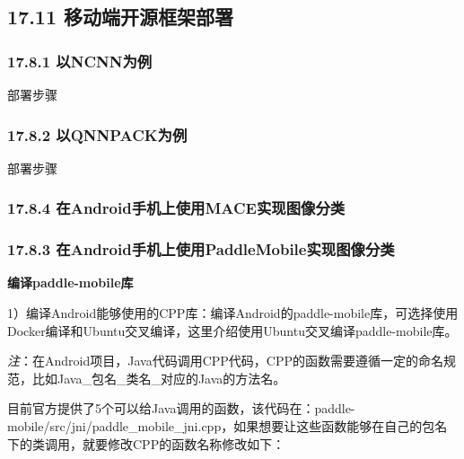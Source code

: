 \subsection{17.11
移动端开源框架部署}\label{ux79fbux52a8ux7aefux5f00ux6e90ux6846ux67b6ux90e8ux7f72}

\subsubsection{17.8.1 以NCNN为例}\label{ux4ee5ncnnux4e3aux4f8b}

部署步骤

\subsubsection{17.8.2 以QNNPACK为例}\label{ux4ee5qnnpackux4e3aux4f8b}

部署步骤

\subsubsection{17.8.4
在Android手机上使用MACE实现图像分类}\label{ux5728androidux624bux673aux4e0aux4f7fux7528maceux5b9eux73b0ux56feux50cfux5206ux7c7b}

\subsubsection{17.8.3
在Android手机上使用PaddleMobile实现图像分类}\label{ux5728androidux624bux673aux4e0aux4f7fux7528paddlemobileux5b9eux73b0ux56feux50cfux5206ux7c7b}

\textbf{编译paddle-mobile库}

1）编译Android能够使用的CPP库：编译Android的paddle-mobile库，可选择使用Docker编译和Ubuntu交叉编译，这里介绍使用Ubuntu交叉编译paddle-mobile库。

\emph{注}：在Android项目，Java代码调用CPP代码，CPP的函数需要遵循一定的命名规范，比如Java\_包名\_类名\_对应的Java的方法名。

​
目前官方提供了5个可以给Java调用的函数，该代码在：paddle-mobile/src/jni/paddle\_mobile\_jni.cpp，如果想要让这些函数能够在自己的包名下的类调用，就要修改CPP的函数名称修改如下：

\begin{Shaded}
\begin{Highlighting}[]
        \NormalTok{(}\NormalTok{); }
\NormalTok{; }
         \NormalTok{()->}\NormalTok{(}
\end{Highlighting}
\end{Shaded}

